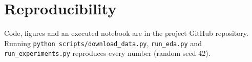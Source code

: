 \documentclass[conference]{IEEEtran}
\begin{document}
\section*{Reproducibility}
Code, figures and an executed notebook are in the project GitHub repository. Running
\texttt{python scripts/download\_data.py}, \texttt{run\_eda.py} and \texttt{run\_experiments.py} reproduces every number
(random seed 42).



\end{document}
